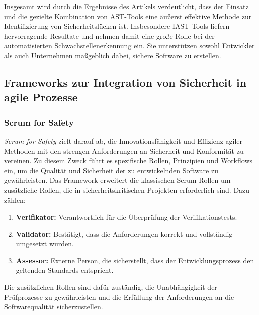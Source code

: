 \documentclass[acmtog]{acmart}
\begin{document}
Insgesamt wird durch die Ergebnisse des Artikels verdeutlicht, dass der Einsatz und die gezielte Kombination von AST-Tools eine äußerst effektive Methode zur Identifizierung von Sicherheitslücken ist.
Insbesondere IAST-Tools liefern hervorragende Resultate und nehmen damit eine große Rolle bei der automatisierten Schwachstellenerkennung ein.
Sie unterstützen sowohl Entwickler als auch Unternehmen maßgeblich dabei, sichere Software zu erstellen. 
\cite{mateo_tudela_combining_2020}

\subsection{Frameworks zur Integration von Sicherheit in agile Prozesse}

\subsubsection{Scrum for Safety}

\textit{Scrum for Safety} zielt darauf ab, die Innovationsfähigkeit und Effizienz agiler Methoden mit den strengen Anforderungen an Sicherheit und Konformität zu vereinen. 
Zu diesem Zweck führt es spezifische Rollen, Prinzipien und Workflows ein, um die Qualität und Sicherheit der zu entwickelnden Software zu gewährleisten. 
Das Framework erweitert die klassischen Scrum-Rollen um zusätzliche Rollen, die in sicherheitskritischen Projekten erforderlich sind. \cite{barbareschi_scrum_2022} Dazu zählen: 

\begin{enumerate}
  \item \textbf{Verifikator:} Verantwortlich für die Überprüfung der Verifikationstests.
  \item \textbf{Validator:} Bestätigt, dass die Anforderungen korrekt und vollständig umgesetzt wurden.
  \item \textbf{Assessor:} Externe Person, die sicherstellt, dass der Entwicklungsprozess den geltenden Standards entspricht.
\end{enumerate}

Die zusätzlichen Rollen sind dafür zuständig, 
die Unabhängigkeit der Prüfprozesse zu gewährleisten und die Erfüllung der Anforderungen an die Softwarequalität sicherzustellen. \cite{barbareschi_scrum_2022}
\end{document}
